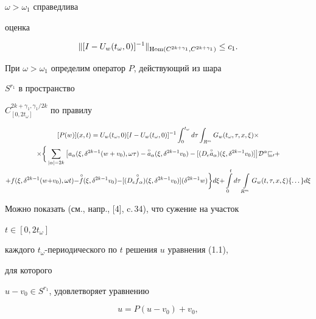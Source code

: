 $\omega>\omega_1$ справедлива 


оценка 


$$ 


\|[I-U_w(t_\omega,0)]^{-1}\|_{\Hom(C^{2k+\gamma_1},C^{2k+\gamma_1})} 


\le c_1. 


$$ 


При $\omega>\omega_1$ определим оператор $P$, действующий из шара 


$S^{r_1}$ в пространство 


$C^{2k+\gamma_1,\gamma_1/2k}_{[0,2t_\omega]}$ по правилу 


\begin{multline} 


[P(w)](x,t)=U_w(t_\omega,0)[I-U_w(t_\omega,0)]^{-1} 


\int^{t_\omega}_0d\tau\int_{R^m}G_w(t_\omega,\tau,x,\xi)\times\\ 


% 


\times\bigg\{\sum_{|\alpha|=2k}\big[a_\alpha(\xi,\delta^{2k-1}(w+v_0), 


\omega\tau)-\up{\circ}{a}_\alpha(\xi,\delta^{2k-1}v_0) 


-[(D_e\up{\circ}{a}_\alpha)(\xi,\delta^{2k-1}v_0)]\big]


\cal D^\alpha v_0+\\ 


% 


{+}f(\xi,\delta^{2k{-}1}(w{+}v_0),\omega t){-}\up{\,\circ}{f}


(\xi,\delta^{2k{-}1}v_0)


{-}[(D_e\up{\,\circ}{f}_\alpha)(\xi,\delta^{2k{-}1}v_0)] 


(\delta^{2k{-}1}w)\bigg\}d\xi{+}\int\limits^t_0 d\tau\int\limits_{R^m} 


G_w(t,\tau,x,\xi)\{\dotsc\}d\xi 


\end{multline} 


 


Можно показать (см., напр., [4], c.\,34), что сужение на участок 


$t\in[0,2t_\omega]$ 


каждого $t_\omega$-периодического по $t$ решения $u$ уравнения (1.1), 


для которого 


$u-v_0\in S^{r_1}$, удовлетворяет уравнению 


\begin{equation} 


u=P(u-v_0)+v_0, 


\end{equation} 


